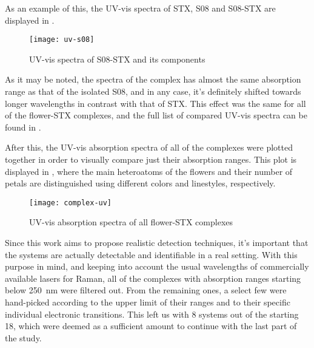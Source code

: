 As an example of this, the UV-vis spectra of STX, S08 and S08-STX are displayed in .

\begin{figure}
    \texttt{[image: uv-s08]}
    \caption[UV-vis spectrum of S08-STX]{UV-vis spectra of S08-STX and its components}
\end{figure}

As it may be noted, the spectra of the complex has almost the same absorption range as that of the isolated S08, and in any case, it's definitely shifted towards longer wavelengths in contrast with that of STX.
This effect was the same for all of the flower-STX complexes, and the full list of compared UV-vis spectra can be found in .

After this, the UV-vis absorption spectra of all of the complexes were plotted together in order to visually compare just their absorption ranges. This plot is displayed in , where the main heteroatoms of the flowers and their number of petals are distinguished using different colors and linestyles, respectively.

\begin{figure*}
    \texttt{[image: complex-uv]}
    \caption[UV-vis absorption spectra of all complexes]{UV-vis absorption spectra of all flower-STX complexes}
\end{figure*}

Since this work aims to propose realistic detection techniques, it's important that the systems are actually detectable and identifiable in a real setting.
With this purpose in mind, and keeping into account the usual wavelengths of commercially available lasers for Raman, all of the complexes with absorption ranges starting below \SI{250}{\nano\metre} were filtered out.
From the remaining ones, a select few were hand-picked according to the upper limit of their ranges and to their specific individual electronic transitions.
This left us with 8 systems out of the starting 18, which were deemed as a sufficient amount to continue with the last part of the study.

